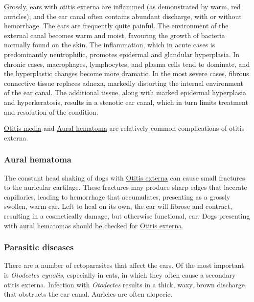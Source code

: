 \documentclass[
  openany]{article}
\begin{document}
Grossly, ears with otitis externa are inflammed (as demonstrated by warm, red auricles), and the ear canal often contains abundant discharge, with or without hemorrhage. The ears are frequently quite painful. The environment of the external canal becomes warm and moist, favouring the growth of bacteria normally found on the skin. The inflammation, which in acute cases is predominantly neutrophilic, promotes epidermal and glandular hyperplasia. In chronic cases, macrophages, lymphocytes, and plasma cells tend to dominate, and the hyperplastic changes become more dramatic. In the most severe cases, fibrous connective tissue replaces adnexa, markedly distorting the internal environment of the ear canal. The additional tissue, along with marked epidermal hyperplasia and hyperkeratosis, results in a stenotic ear canal, which in turn limits treatment and resolution of the condition.

\protect\hyperlink{otitis-media}{Otitis media} and \protect\hyperlink{aural-hematoma}{Aural hematoma} are relatively common complications of otitis externa.

\hypertarget{aural-hematoma}{%
\subsubsection{Aural hematoma}\label{aural-hematoma}}

The constant head shaking of dogs with \protect\hyperlink{otitis-externa}{Otitis externa} can cause small fractures to the auricular cartilage. These fractures may produce sharp edges that lacerate capillaries, leading to hemorrhage that accumulates, presenting as a grossly swollen, warm ear. Left to heal on its own, the ear will fibrose and contract, resulting in a cosmetically damage, but otherwise functional, ear. Dogs presenting with aural hematomas should be checked for \protect\hyperlink{otitis-externa}{Otitis externa}.

\hypertarget{parasitic-diseases}{%
\subsubsection{Parasitic diseases}\label{parasitic-diseases}}

There are a number of ectoparasites that affect the ears. Of the most important is \emph{Otodectes cynotis}, especially in cats, in which they often cause a secondary otitis externa. Infection with \emph{Otodectes} results in a thick, waxy, brown discharge that obstructs the ear canal. Auricles are often alopecic.
\end{document}

